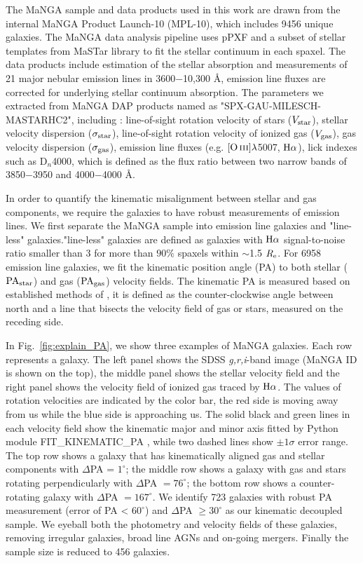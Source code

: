 The MaNGA sample and data products used in this work are drawn from the internal MaNGA Product Launch-10 (MPL-10), which includes 9456 unique galaxies. The MaNGA data analysis pipeline \citep[DAP,][]{westfall2019data} uses pPXF \citep{cappellari2004parametric} and a subset of stellar templates  from MaSTar library \citep{yan_sdss-iv_2019} to fit the stellar continuum in each spaxel. The data products include estimation of the stellar absorption and measurements of 21 major nebular emission lines in 3600$-$10,300 \r{A}, emission line fluxes are corrected for underlying stellar continuum absorption. The parameters we extracted from MaNGA DAP products named as "SPX-GAU-MILESCH-MASTARHC2", including : line-of-sight rotation velocity of stars ($V_{\rm star}$), stellar velocity dispersion (${\sigma}_{\rm star}$), line-of-sight rotation velocity of ionized gas ($V_{\rm gas}$), gas velocity dispersion (${\sigma}_{\rm gas}$), emission line fluxes (e.g. $\hbox{[O\,{\sc iii}]}\lambda$5007, $\hbox{H$\alpha$}$), lick indexes such as D$_n$4000, which is defined as the flux ratio between two narrow bands of 3850$-$3950 and 4000$-$4000 \r{A}.

In order to quantify the kinematic misalignment between stellar and gas components, we require the galaxies to have robust measurements of emission lines. We first separate the MaNGA sample into emission line galaxies and "line-less" galaxies."line-less" galaxies are defined as galaxies with $\hbox{H$\alpha$}$ signal-to-noise ratio smaller than 3 for more than $90\%$ spaxels within $\sim$1.5 $R_{\rm e}$. For 6958 emission line galaxies, we fit the kinematic position angle (PA) to both stellar (${\rm PA}_{\rm star}$) and gas (${\rm PA}_{\rm gas}$) velocity fields. The kinematic PA is measured based on established methods of \citet{krajnovic_kinemetry_2006}, it is defined as the counter-clockwise angle between north and a line that bisects the velocity field of gas or stars, measured on the receding side.

In Fig.~\ref{fig:explain_PA}, we show three examples of MaNGA galaxies. Each row represents a galaxy. The left panel shows the SDSS \textit{g,r,i}-band image (MaNGA ID is shown on the top), the middle panel shows the stellar velocity field and the right panel shows the velocity field of ionized gas traced by $\hbox{H$\alpha$}$. The values of rotation velocities are indicated by the color bar, the red side is moving away from us while the blue side is approaching us. The solid black and green lines in each velocity field show the kinematic major and minor axis fitted by Python module FIT\_KINEMATIC\_PA \citep{krajnovic_kinemetry_2006}, while two dashed lines show $\pm1\sigma$ error range. The top row shows a galaxy that has kinematically aligned gas and stellar components with $\Delta$PA = $1^{\circ}$; the middle row shows a galaxy with gas and stars rotating perpendicularly with $\Delta$PA $= 76^{\circ}$; the bottom row shows a counter-rotating galaxy with $\Delta$PA $= 167^{\circ}$. We identify 723 galaxies with robust PA measurement (error of PA < $60^{\circ}$) and $\Delta$PA $\ge 30^{\circ}$ as our kinematic decoupled sample. We eyeball both the photometry and velocity fields of these galaxies, removing irregular galaxies, broad line AGNs and on-going mergers. Finally the sample size is reduced to 456 galaxies.

